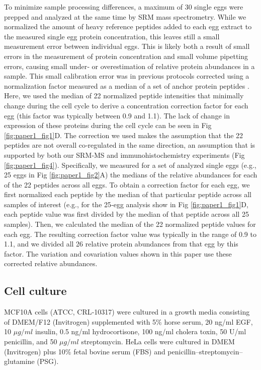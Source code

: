 To minimize sample processing differences, a maximum of 30 single eggs were prepped and analyzed at the same time by SRM mass spectrometry. While we normalized the amount of heavy reference peptides added to each egg extract to the measured single egg protein concentration, this leaves still a small measurement error between individual eggs. This is likely both a result of small errors in the measurement of protein concentration and small volume pipetting errors, causing small under‐ or overestimation of relative protein abundances in a sample. This small calibration error was in previous protocols corrected using a normalization factor measured as a median of a set of anchor protein peptides \cite{Abell2011, Ludwig2012, Feng2016}. Here, we used the median of 22 normalized peptide intensities that minimally change during the cell cycle to derive a concentration correction factor for each egg (this factor was typically between 0.9 and 1.1). The lack of change in expression of these proteins during the cell cycle can be seen in Fig \ref{fig:paper1_fig1}D. The correction we used makes the assumption that the 22 peptides are not overall co‐regulated in the same direction, an assumption that is supported by both our SRM‐MS and immunohistochemistry experiments (Fig \ref{fig:paper1_fig4}). Specifically, we measured for a set of analyzed single eggs (e.g., 25 eggs in Fig \ref{fig:paper1_fig2}A) the medians of the relative abundances for each of the 22 peptides across all eggs. To obtain a correction factor for each egg, we first normalized each peptide by the median of that particular peptide across all samples of interest (e.g., for the 25‐egg analysis show in Fig \ref{fig:paper1_fig1}D, each peptide value was first divided by the median of that peptide across all 25 samples). Then, we calculated the median of the 22 normalized peptide values for each egg. The resulting correction factor value was typically in the range of 0.9 to 1.1, and we divided all 26 relative protein abundances from that egg by this factor. The variation and covariation values shown in this paper use these corrected relative abundances.

\subsection{Cell culture}

MCF10A cells (ATCC, CRL‐10317) were cultured in a growth media consisting of DMEM/F12 (Invitrogen) supplemented with 5\% horse serum, 20 ng/ml EGF, 10 $\mu g/ml$ insulin, 0.5 ng/ml hydrocortisone, 100 ng/ml cholera toxin, 50 U/ml penicillin, and 50 $\mu g/ml$ streptomycin. HeLa cells were cultured in DMEM (Invitrogen) plus 10\% fetal bovine serum (FBS) and penicillin–streptomycin–glutamine (PSG).

